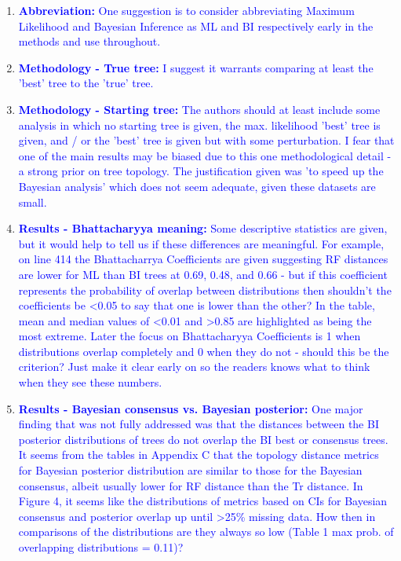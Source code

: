 \documentclass[12pt,letterpaper]{article}
\begin{document}
\begin{enumerate}
\item{\textcolor{blue}{\textbf{Abbreviation:} One suggestion is to consider abbreviating Maximum Likelihood and Bayesian Inference as ML and BI respectively early in the methods and use throughout.}}

\item{\textcolor{blue}{\textbf{Methodology - True tree:} I suggest it warrants comparing at least the 'best' tree to the 'true' tree.}}

\item{\textcolor{blue}{\textbf{Methodology - Starting tree:} The authors should at least include some analysis in which no starting tree is given, the max. likelihood 'best' tree is given, and / or the 'best' tree is given but with some perturbation.
I fear that one of the main results may be biased due to this one methodological detail - a strong prior on tree topology.
The justification given was 'to speed up the Bayesian analysis' which does not seem adequate, given these datasets are small.}}

\item{\textcolor{blue}{\textbf{Results - Bhattacharyya meaning:} Some descriptive statistics are given, but it would help to tell us if these differences are meaningful.
For example, on line 414 the Bhattacharrya Coefficients are given suggesting RF distances are lower for ML than BI trees at 0.69, 0.48, and 0.66 - but if this coefficient represents the probability of overlap between distributions then shouldn't the coefficients be <0.05 to say that one is lower than the other?
In the table, mean and median values of <0.01 and >0.85 are highlighted as being the most extreme.
Later the focus on Bhattacharyya Coefficients is 1 when distributions overlap completely and 0 when they do not - should this be the criterion?
Just make it clear early on so the readers knows what to think when they see these numbers. }}

\item{\textcolor{blue}{\textbf{Results - Bayesian consensus vs. Bayesian posterior:} One major finding that was not fully addressed was that the distances between the BI posterior distributions of trees do not overlap the BI best or consensus trees.
It seems from the tables in Appendix C that the topology distance metrics for Bayesian posterior distribution are similar to those for the Bayesian consensus, albeit usually lower for RF distance than the Tr distance.
In Figure 4, it seems like the distributions of metrics based on CIs for Bayesian consensus and posterior overlap up until >25\% missing data.
How then in comparisons of the distributions are they always so low (Table 1 max prob. of overlapping distributions = 0.11)?}}


\end{enumerate}
\end{document}
